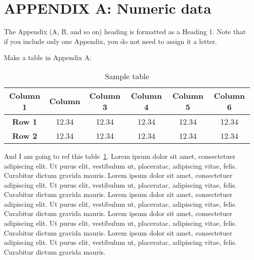 \newcommand{\hbAppendixPrefix}{A}
\renewcommand{\thefigure}{\hbAppendixPrefix.\arabic{figure}}
\setcounter{figure}{0}
\renewcommand{\thetable}{\hbAppendixPrefix.\arabic{table}} 
\setcounter{table}{0}

\let\svaddcontentsline\addcontentsline
\renewcommand\addcontentsline[3]{%
      \ifthenelse{\equal{#1}{lof}}{}%
        {\ifthenelse{\equal{#1}{lot}}{}{\svaddcontentsline{#1}{#2}{#3}}}}

\section{APPENDIX \hbAppendixPrefix: Numeric data}

The Appendix (A, B, and so on) heading is formatted as a Heading 1. Note that if you include only one Appendix, you do not need to assign it a letter. 

Make a table in Appendix A:
\begin{table}[ht]
    \centering
    \captionsetup{width=0.8\linewidth} %
    \caption{Sample table}
    \begin{tabular}{cccccc}
         \hline
         \textbf{Column 1} & \textbf{Column}  & \textbf{Column 3} & \textbf{Column 4} & \textbf{Column 5} & \textbf{Column 6}\\
         \hline
         \textbf{Row 1} & 12.34 & 12.34 & 12.34 & 12.34 & 12.34 \\
         \hline
         \textbf{Row 2} & 12.34 & 12.34 & 12.34 & 12.34 & 12.34 \\
         \hline
    \end{tabular}
    \label{table:tableA1}
\end{table}

And I am going to ref this table~\cref{table:tableA1}.
Lorem ipsum dolor sit amet, consectetuer adipiscing elit.  Ut purus elit, vestibulum ut, placeratac,  adipiscing vitae,  felis.   Curabitur dictum gravida mauris.  
Lorem ipsum dolor sit amet, consectetuer adipiscing elit.  Ut purus elit, vestibulum ut, placeratac,  adipiscing vitae,  felis.   Curabitur dictum gravida mauris.  
Lorem ipsum dolor sit amet, consectetuer adipiscing elit.  Ut purus elit, vestibulum ut, placeratac,  adipiscing vitae,  felis.   Curabitur dictum gravida mauris.  
Lorem ipsum dolor sit amet, consectetuer adipiscing elit.  Ut purus elit, vestibulum ut, placeratac,  adipiscing vitae,  felis.   Curabitur dictum gravida mauris.  
Lorem ipsum dolor sit amet, consectetuer adipiscing elit.  Ut purus elit, vestibulum ut, placeratac,  adipiscing vitae,  felis.   Curabitur dictum gravida mauris.  
